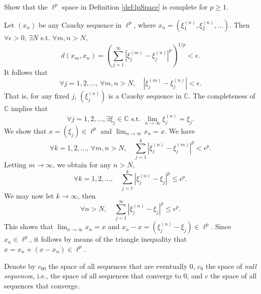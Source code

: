 \begin{exc}
  \label{exc:ellPisComplete}
  Show that the $\ell^p$ space in Definition \ref{def:lpSpace}
  is complete for $p\ge 1$.
\end{exc}
\begin{solution}
  Let $(x_n)$ be any Cauchy sequence in $\ell^p$,
  where $x_n = \left( \xi_1^{(n)}, \xi_2^{(n)}, \ldots \right)$.
  Then $\forall \epsilon > 0$,
  $\exists N$
  s.t. $\forall m, n > N$,
  \begin{equation*}
    d(x_m, x_n) = \left( \sum_{j=1}^{\infty}\left| \xi_j^{(m)} - \xi_j^{(n)} \right|^p \right)^{1/p}
    < \epsilon.
  \end{equation*}
  It follows that
  \begin{equation*}
    \forall j = 1, 2, \ldots, \,
    \forall m, n > N, \quad
    \left| \xi_j^{(m)} - \xi_j^{(n)} \right| < \epsilon.
  \end{equation*}
  That is,
  for any fixed $j$,
  $\left( \xi_j^{(n)} \right)$ is a Cauchy sequence in $\mathbb{C}$.
  The completeness of $\mathbb{C}$ implies that
  \begin{equation*}
    \forall j=1, 2, \ldots,
    \exists \xi_j \in \mathbb{C}
    \text{ s.t. }
    \lim_{n\rightarrow\infty}\xi_j^{(n)} = \xi_j.
  \end{equation*}
  We show that $x = (\xi_j)\in \ell^p$ and
  $\lim_{n\rightarrow\infty}x_n = x$.
  We have
  \begin{equation*}
    \forall k=1, 2, \ldots, \,
    \forall m, n > N, \quad
    \sum_{j=1}^k \left| \xi_j^{(n)} - \xi_j^{(m)} \right|^p < \epsilon^p.
  \end{equation*}
  Letting $m\rightarrow\infty$,
  we obtain for any $n > N$,
  \begin{equation*}
    \forall k=1, 2, \ldots, \quad
    \sum_{j=1}^k \left| \xi_j^{(n)} - \xi_j \right|^p \le \epsilon^p.
  \end{equation*}
  We may now let $k\rightarrow\infty$,
  then
  \begin{equation*}
    \forall n > N, \quad
    \sum_{j=1}^{\infty} \left| \xi_j^{(n)} - \xi_j \right|^p \le \epsilon^p.
  \end{equation*}
  This shows that
  $\lim_{n\rightarrow\infty}x_n = x$ and
  $x_n - x = \left( \xi_j^{(n)} - \xi_j \right)\in \ell^p$.
  Since $x_n\in \ell^p$,
  it follows by means of the triangle inequality that
  $x = x_n + (x - x_n)\in \ell^p$.
\end{solution}

\begin{ntn}
  \label{ntn:zeroSequenceSpaces}
  Denote by $c_{00}$ the space of all sequences
  that are eventually 0,
  $c_0$ the space of \emph{null sequence}s,
  i.e., the space of all sequences that converge to 0,
  and $c$ the space of all sequences that converge.
\end{ntn}

